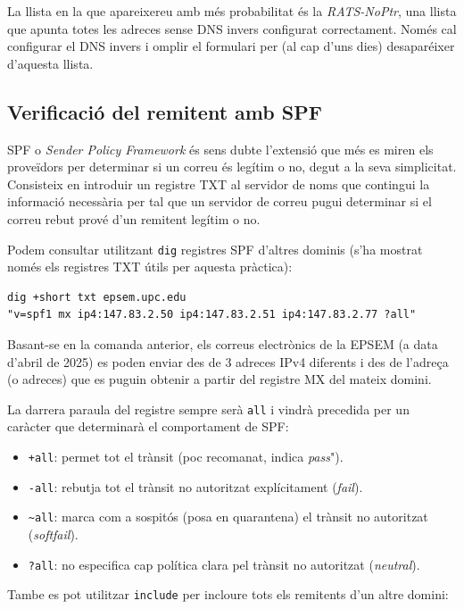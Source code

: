 \documentclass{practicaitic}
\begin{document}
La llista en la que apareixereu amb més probabilitat és la \textit{RATS-NoPtr},
una llista que apunta totes les adreces sense DNS invers configurat
correctament. Només cal configurar el DNS invers i omplir el formulari per
(al cap d'uns dies) desaparéixer d'aquesta llista.

\subsection{Verificació del remitent amb SPF}

SPF o \textit{Sender Policy Framework} és sens dubte l'extensió que més es miren
els proveïdors per determinar si un correu és legítim o no, degut a la seva
simplicitat. Consisteix en introduir un registre TXT al servidor de noms
que contingui la informació necessària per tal que un servidor de correu pugui
determinar si el correu rebut prové d'un remitent legítim o no.

Podem consultar utilitzant \texttt{dig} registres SPF d'altres dominis
(s'ha mostrat només els registres TXT útils per aquesta pràctica):

\begin{verbatim}
dig +short txt epsem.upc.edu
"v=spf1 mx ip4:147.83.2.50 ip4:147.83.2.51 ip4:147.83.2.77 ?all"
\end{verbatim}

Basant-se en la comanda anterior, els correus electrònics de la EPSEM
(a data d'abril de 2025) es poden enviar des de 3 adreces IPv4 diferents i
des de l'adreça (o adreces) que es puguin obtenir a partir del
registre MX del mateix domini.

La darrera paraula del registre sempre serà \texttt{all} i vindrà precedida per
un caràcter que determinarà el comportament de SPF:
\begin{itemize}
  \item \texttt{+all}: permet tot el trànsit (poc recomanat, indica \textit{pass}").
  \item \texttt{-all}: rebutja tot el trànsit no autoritzat explícitament (\textit{fail}).
  \item \verb|~all|: marca com a sospitós (posa en quarantena) el trànsit no autoritzat (\textit{softfail}).
  \item \texttt{?all}: no especifica cap política clara pel trànsit no autoritzat (\textit{neutral}).
\end{itemize}

Tambe es pot utilitzar \texttt{include} per incloure tots els remitents d'un altre
domini:
\end{document}
